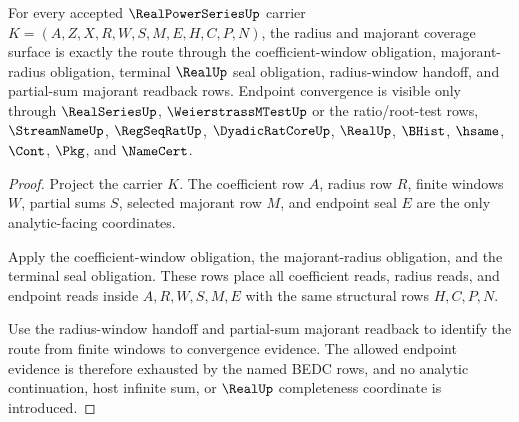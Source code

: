 \begin{theorem}
\label{thm:real-power-series-radius-majorant-coverage}
For every accepted $\RealPowerSeriesUp$ carrier $K=(A,Z,X,R,W,S,M,E,H,C,P,N)$, the radius and majorant coverage surface is exactly the route through the coefficient-window obligation, majorant-radius obligation, terminal $\RealUp$ seal obligation, radius-window handoff, and partial-sum majorant readback rows. Endpoint convergence is visible only through $\RealSeriesUp$, $\WeierstrassMTestUp$ or the ratio/root-test rows, $\StreamNameUp$, $\RegSeqRatUp$, $\DyadicRatCoreUp$, $\RealUp$, $\BHist$, $\hsame$, $\Cont$, $\Pkg$, and $\NameCert$.
\end{theorem}
\begin{proof}
Project the carrier $K$. The coefficient row $A$, radius row $R$, finite windows $W$, partial sums $S$, selected majorant row $M$, and endpoint seal $E$ are the only analytic-facing coordinates.

Apply the coefficient-window obligation, the majorant-radius obligation, and the terminal seal obligation. These rows place all coefficient reads, radius reads, and endpoint reads inside $A,R,W,S,M,E$ with the same structural rows $H,C,P,N$.

Use the radius-window handoff and partial-sum majorant readback to identify the route from finite windows to convergence evidence. The allowed endpoint evidence is therefore exhausted by the named BEDC rows, and no analytic continuation, host infinite sum, or $\RealUp$ completeness coordinate is introduced.
\end{proof}

